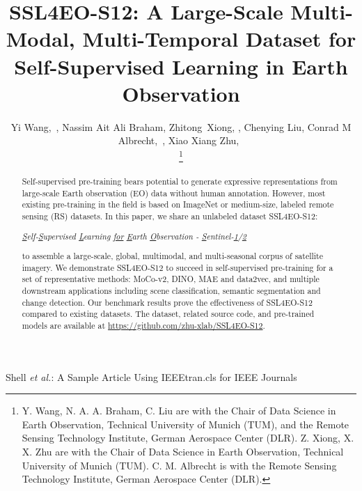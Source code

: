 \documentclass[lettersize,journal]{IEEEtran}
\begin{document}
\title{SSL4EO-S12: A Large-Scale Multi-Modal, Multi-Temporal Dataset for Self-Supervised Learning in Earth Observation}

\author{Yi Wang,~, Nassim Ait Ali Braham, Zhitong~Xiong, , Chenying Liu, Conrad M Albrecht,~, Xiao Xiang Zhu,~



\thanks{Y. Wang, N. A. A. Braham, C. Liu are with the Chair of Data Science in Earth Observation, Technical University of Munich (TUM), and the Remote Sensing Technology Institute, German Aerospace Center (DLR). Z. Xiong, X. X. Zhu are with the Chair of Data Science in Earth Observation, Technical University of Munich (TUM). C. M. Albrecht is with the Remote Sensing Technology Institute, German Aerospace Center (DLR).}

}


{Shell \MakeLowercase{\textit{et al.}}: A Sample Article Using IEEEtran.cls for IEEE Journals}





\maketitle
\vspace{-2em}
\begin{abstract}
Self-supervised pre-training bears potential to generate expressive representations from large-scale Earth observation (EO) data without human annotation. However, most existing pre-training in the field is based on ImageNet or medium-size, labeled remote sensing (RS) datasets. In this paper, we share an unlabeled dataset SSL4EO-S12:
\begin{center}
\textit{
\underline{S}elf-\underline{S}upervised \underline{L}earning \underline{for} \underline{E}arth \underline{O}bservation - \underline{S}entinel-\underline{1}/\underline{2}}
\end{center}
to assemble a large-scale, global, multimodal, and multi-seasonal corpus of satellite imagery. We demonstrate SSL4EO-S12 to succeed in self-supervised pre-training for a set of representative methods: MoCo-v2, DINO, MAE and data2vec, and multiple downstream applications including scene classification, semantic segmentation and change detection. Our benchmark results prove the effectiveness of SSL4EO-S12 compared to existing datasets. The dataset, related source code, and pre-trained models are available at \url{https://github.com/zhu-xlab/SSL4EO-S12}.
\end{abstract}
\end{document}
